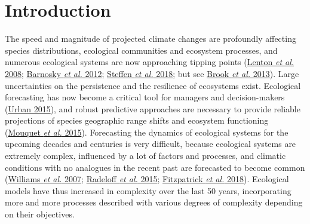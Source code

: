 \documentclass[11pt,]{article}
\begin{document}
\vskip -8.5pt



\noindent \doublespacing

\hypertarget{introduction}{%
\section{Introduction}\label{introduction}}

The speed and magnitude of projected climate changes are profoundly
affecting species distributions, ecological communities and ecosystem
processes, and numerous ecological systems are now approaching tipping
points (\protect\hyperlink{ref-Lenton2008}{Lenton \emph{et al.} 2008};
\protect\hyperlink{ref-Barnosky2012}{Barnosky \emph{et al.} 2012};
\protect\hyperlink{ref-Steffen2018}{Steffen \emph{et al.} 2018}; but see
\protect\hyperlink{ref-Brook2013}{Brook \emph{et al.} 2013}). Large
uncertainties on the persistence and the resilience of ecosystems exist.
Ecological forecasting has now become a critical tool for managers and
decision-makers (\protect\hyperlink{ref-Urban2015}{Urban 2015}), and
robust predictive approaches are necessary to provide reliable
projections of species geographic range shifts and ecosystem functioning
(\protect\hyperlink{ref-Mouquet2015}{Mouquet \emph{et al.} 2015}).
Forecasting the dynamics of ecological systems for the upcoming decades
and centuries is very difficult, because ecological systems are
extremely complex, influenced by a lot of factors and processes, and
climatic conditions with no analogues in the recent past are forecasted
to become common (\protect\hyperlink{ref-Williams2007}{Williams \emph{et
al.} 2007}; \protect\hyperlink{ref-Radeloff2015}{Radeloff \emph{et al.}
2015}; \protect\hyperlink{ref-Fitzpatrick2018}{Fitzpatrick \emph{et al.}
2018}). Ecological models have thus increased in complexity over the
last 50 years, incorporating more and more processes described with
various degrees of complexity depending on their objectives.
\end{document}

